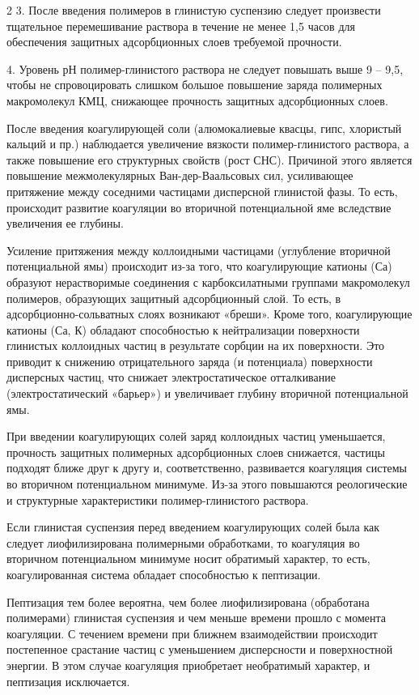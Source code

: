 \begin{multicols}{2}
3. После введения полимеров в глинистую суспензию следует произвести
тщательное перемешивание раствора в течение не менее 1,5 часов для
обеспечения защитных адсорбционных слоев требуемой прочности.

4. Уровень рН полимер-глинистого раствора не следует повышать выше 9 --
9,5, чтобы не спровоцировать слишком большое повышение заряда полимерных
макромолекул КМЦ, снижающее прочность защитных адсорбционных слоев.

После введения коагулирующей соли (алюмокалиевые квасцы, гипс, хлористый
кальций и пр.) наблюдается увеличение вязкости полимер-глинистого
раствора, а также повышение его структурных свойств (рост СНС). Причиной
этого является повышение межмолекулярных Ван-дер-Ваальсовых сил,
усиливающее притяжение между соседними частицами дисперсной глинистой
фазы. То есть, происходит развитие коагуляции во вторичной потенциальной
яме вследствие увеличения ее глубины.

Усиление притяжения между коллоидными частицами (углубление вторичной
потенциальной ямы) происходит из-за того, что коагулирующие катионы
(Са) образуют нерастворимые соединения с
карбоксилатными группами макромолекул полимеров, образующих защитный
адсорбционный слой. То есть, в адсорбционно-сольватных слоях возникают
«бреши». Кроме того, коагулирующие катионы (Са,
К\tsp{+}) обладают способностью к нейтрализации поверхности
глинистых коллоидных частиц в результате сорбции на их поверхности. Это
приводит к снижению отрицательного заряда (и потенциала) поверхности
дисперсных частиц, что снижает электростатическое отталкивание
(электростатический «барьер») и увеличивает глубину вторичной
потенциальной ямы.

При введении коагулирующих солей заряд коллоидных частиц уменьшается,
прочность защитных полимерных адсорбционных слоев снижается, частицы
подходят ближе друг к другу и, соответственно, развивается коагуляция
системы во вторичном потенциальном минимуме. Из-за этого повышаются
реологические и структурные характеристики полимер-глинистого раствора.

Если глинистая суспензия перед введением коагулирующих солей была как
следует лиофилизирована полимерными обработками, то коагуляция во
вторичном потенциальном минимуме носит обратимый характер, то есть,
коагулированная система обладает способностью к пептизации.

Пептизация тем более вероятна, чем более лиофилизирована (обработана
полимерами) глинистая суспензия и чем меньше времени прошло с момента
коагуляции. С течением времени при ближнем взаимодействии происходит
постепенное срастание частиц с уменьшением дисперсности и поверхностной
энергии. В этом случае коагуляция приобретает необратимый характер, и
пептизация исключается.


\end{multicols}
